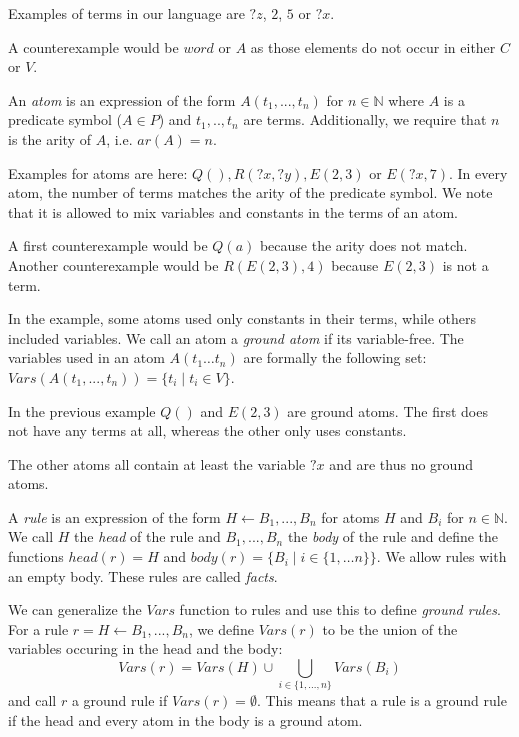 \begin{contexample}
    Examples of terms in our language are $?z$, $2$, $5$ or $?x$.

    A counterexample would be $word$ or $A$ as those elements do not occur in either $C$ or $V$.
\end{contexample}

An \textit{atom} is an expression of the form $A(t_1,...,t_n)$ for $n \in \mathbb{N}$ where $A$ is a predicate symbol ($A \in P$) and $t_1,..,t_n$ are terms. Additionally, we require that $n$ is the arity of $A$, i.e. $ar(A) = n$.

\begin{contexample}
    Examples for atoms are here: $Q(), R(?x,?y), E(2,3)$ or $E(?x, 7)$. In every atom, the number of terms matches the arity of the predicate symbol. We note that it is allowed to mix variables and constants in the terms of an atom.

    A first counterexample would be $Q(a)$ because the arity does not match. 
    Another counterexample would be $R(E(2,3),4)$ because $ E(2,3)$ is not a term.
\end{contexample}

In the example, some atoms used only constants in their terms, while others included variables. We call an atom a \textit{ground atom} if its variable-free. The variables used in an atom $A(t_1 \dots t_n)$ are formally the following set: $Vars(A(t_1,...,t_n)) = \{t_i \mid t_i \in V\}$.

\begin{contexample}
    In the previous example $Q()$ and $E(2,3)$ are ground atoms. The first does not have any terms at all, whereas the other only uses constants.

    The other atoms all contain at least the variable $?x$ and are thus no ground atoms.
\end{contexample}

A \textit{rule} is an expression of the form $H \leftarrow B_1 , ... , B_n$ for atoms $H$ and $B_i$ for $n \in \mathbb{N}$. We call $H$ the \textit{head} of the rule and $B_1,..., B_n$ the \textit{body} of the rule and define the functions $head(r) = H$ and $body(r) = \{B_i \mid i \in \{1,\dots n\}\}$. We allow rules with an empty body. These rules are called \textit{facts}.

We can generalize the $Vars$ function to rules and use this to define \textit{ground rules}. For a rule $r = H \leftarrow B_1 , ... ,B_n$, we define $Vars(r)$ to be the union of the variables occuring in the head and the body: \[Vars(r) = Vars(H) \cup \bigcup_{i \in \{1,..., n\}} Vars(B_i)\] and call $r$ a ground rule if $Vars(r) = \emptyset$. This means that a rule is a ground rule if the head and every atom in the body is a ground atom.


